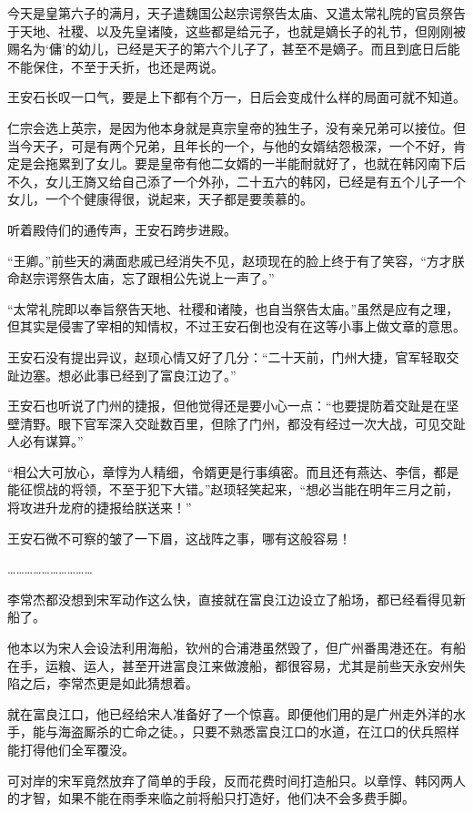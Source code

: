 今天是皇第六子的满月，天子遣魏国公赵宗谔祭告太庙、又遣太常礼院的官员祭告于天地、社稷、以及先皇诸陵，这些都是给元子，也就是嫡长子的礼节，但刚刚被赐名为‘傭’的幼儿，已经是天子的第六个儿子了，甚至不是嫡子。而且到底日后能不能保住，不至于夭折，也还是两说。

王安石长叹一口气，要是上下都有个万一，日后会变成什么样的局面可就不知道。

仁宗会选上英宗，是因为他本身就是真宗皇帝的独生子，没有亲兄弟可以接位。但当今天子，可是有两个兄弟，且年长的一个，与他的女婿结怨极深，一个不好，肯定是会拖累到了女儿。要是皇帝有他二女婿的一半能耐就好了，也就在韩冈南下后不久，女儿王旖又给自己添了一个外孙，二十五六的韩冈，已经是有五个儿子一个女儿，一个个健康得很，说起来，天子都是要羡慕的。

听着殿侍们的通传声，王安石跨步进殿。

“王卿。”前些天的满面悲戚已经消失不见，赵顼现在的脸上终于有了笑容，“方才朕命赵宗谔祭告太庙，忘了跟相公先说上一声了。”

“太常礼院即以奉旨祭告天地、社稷和诸陵，也自当祭告太庙。”虽然是应有之理，但其实是侵害了宰相的知情权，不过王安石倒也没有在这等小事上做文章的意思。

王安石没有提出异议，赵顼心情又好了几分：“二十天前，门州大捷，官军轻取交趾边塞。想必此事已经到了富良江边了。”

王安石也听说了门州的捷报，但他觉得还是要小心一点：“也要提防着交趾是在坚壁清野。眼下官军深入交趾数百里，但除了门州，都没有经过一次大战，可见交趾人必有谋算。”

“相公大可放心，章惇为人精细，令婿更是行事缜密。而且还有燕达、李信，都是能征惯战的将领，不至于犯下大错。”赵顼轻笑起来，“想必当能在明年三月之前，将攻进升龙府的捷报给朕送来！”

王安石微不可察的皱了一下眉，这战阵之事，哪有这般容易！

…………………………

李常杰都没想到宋军动作这么快，直接就在富良江边设立了船场，都已经看得见新船了。

他本以为宋人会设法利用海船，钦州的合浦港虽然毁了，但广州番禺港还在。有船在手，运粮、运人，甚至开进富良江来做渡船，都很容易，尤其是前些天永安州失陷之后，李常杰更是如此猜想着。

就在富良江口，他已经给宋人准备好了一个惊喜。即便他们用的是广州走外洋的水手，能与海盗厮杀的亡命之徒。，只要不熟悉富良江口的水道，在江口的伏兵照样能打得他们全军覆没。

可对岸的宋军竟然放弃了简单的手段，反而花费时间打造船只。以章惇、韩冈两人的才智，如果不能在雨季来临之前将船只打造好，他们决不会多费手脚。

